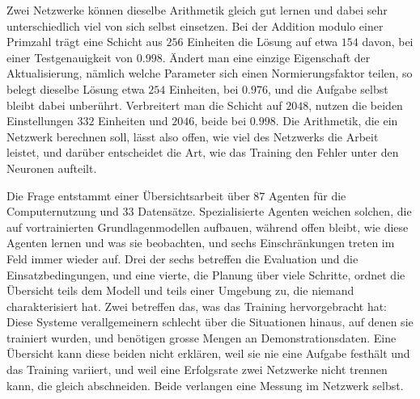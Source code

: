 %
%
%

Zwei Netzwerke können dieselbe Arithmetik gleich gut lernen und dabei sehr
unterschiedlich viel von sich selbst einsetzen. Bei der Addition modulo einer
Primzahl trägt eine Schicht aus $256$ Einheiten die Lösung auf etwa $154$
davon, bei einer Testgenauigkeit von $0.998$. Ändert man eine einzige
Eigenschaft der Aktualisierung, nämlich welche Parameter sich einen
Normierungsfaktor teilen, so belegt dieselbe Lösung etwa $254$ Einheiten, bei
$0.976$, und die Aufgabe selbst bleibt dabei unberührt. Verbreitert man die
Schicht auf $2048$, nutzen die beiden Einstellungen $332$ Einheiten und
$2046$, beide bei $0.998$. Die Arithmetik, die ein Netzwerk berechnen soll,
lässt also offen, wie viel des Netzwerks die Arbeit leistet, und darüber
entscheidet die Art, wie das Training den Fehler unter den Neuronen
aufteilt.

Die Frage entstammt einer Übersichtsarbeit über $87$ Agenten für die Computernutzung
und $33$ Datensätze. Spezialisierte Agenten weichen solchen, die auf
vortrainierten Grundlagenmodellen aufbauen, während offen bleibt, wie diese
Agenten lernen und was sie beobachten, und sechs Einschränkungen treten im
Feld immer wieder auf. Drei der sechs betreffen die Evaluation und die
Einsatzbedingungen, und eine vierte, die Planung über viele Schritte, ordnet
die Übersicht teils dem Modell und teils einer Umgebung zu, die niemand
charakterisiert hat. Zwei betreffen das, was das Training hervorgebracht
hat: Diese Systeme verallgemeinern schlecht über die Situationen
hinaus, auf denen sie trainiert wurden, und benötigen grosse Mengen an
Demonstrationsdaten. Eine Übersicht kann diese beiden nicht erklären, weil sie
nie eine Aufgabe festhält und das Training variiert, und weil eine Erfolgsrate
zwei Netzwerke nicht trennen kann, die gleich abschneiden. Beide verlangen
eine Messung im Netzwerk selbst.


